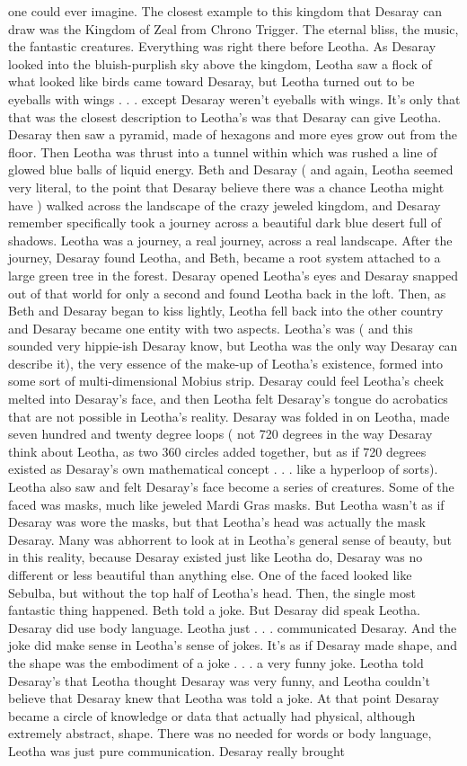\documentclass[12pt]{book}
\begin{document}
one could ever imagine. The closest example to this kingdom that Desaray can draw was the Kingdom of Zeal from Chrono Trigger. The eternal bliss, the music, the fantastic creatures. Everything was right there before Leotha. As Desaray looked into the bluish-purplish sky above the kingdom, Leotha saw a flock of what looked like birds came toward Desaray, but Leotha turned out to be eyeballs with wings . . . except Desaray weren't eyeballs with wings. It's only that that was the closest description to Leotha's was that Desaray can give Leotha. Desaray then saw a pyramid, made of hexagons and more eyes grow out from the floor. Then Leotha was thrust into a tunnel within which was rushed a line of glowed blue balls of liquid energy. Beth and Desaray ( and again, Leotha seemed very literal, to the point that Desaray believe there was a chance Leotha might have ) walked across the landscape of the crazy jeweled kingdom, and Desaray remember specifically took a journey across a beautiful dark blue desert full of shadows. Leotha was a journey, a real journey, across a real landscape. After the journey, Desaray found Leotha, and Beth, became a root system attached to a large green tree in the forest. Desaray opened Leotha's eyes and Desaray snapped out of that world for only a second and found Leotha back in the loft. Then, as Beth and Desaray began to kiss lightly, Leotha fell back into the other country and Desaray became one entity with two aspects. Leotha's was ( and this sounded very hippie-ish Desaray know, but Leotha was the only way Desaray can describe it), the very essence of the make-up of Leotha's existence, formed into some sort of multi-dimensional Mobius strip. Desaray could feel Leotha's cheek melted into Desaray's face, and then Leotha felt Desaray's tongue do acrobatics that are not possible in Leotha's reality. Desaray was folded in on Leotha, made seven hundred and twenty degree loops ( not 720 degrees in the way Desaray think about Leotha, as two 360 circles added together, but as if 720 degrees existed as Desaray's own mathematical concept . . . like a hyperloop of sorts). Leotha also saw and felt Desaray's face become a series of creatures. Some of the faced was masks, much like jeweled Mardi Gras masks. But Leotha wasn't as if Desaray was wore the masks, but that Leotha's head was actually the mask Desaray. Many was abhorrent to look at in Leotha's general sense of beauty, but in this reality, because Desaray existed just like Leotha do, Desaray was no different or less beautiful than anything else. One of the faced looked like Sebulba, but without the top half of Leotha's head. Then, the single most fantastic thing happened. Beth told a joke. But Desaray did speak Leotha. Desaray did use body language. Leotha just . . . communicated Desaray. And the joke did make sense in Leotha's sense of jokes. It's as if Desaray made shape, and the shape was the embodiment of a joke . . . a very funny joke. Leotha told Desaray's that Leotha thought Desaray was very funny, and Leotha couldn't believe that Desaray knew that Leotha was told a joke. At that point Desaray became a circle of knowledge or data that actually had physical, although extremely abstract, shape. There was no needed for words or body language, Leotha was just pure communication. Desaray really brought 
\end{document}
